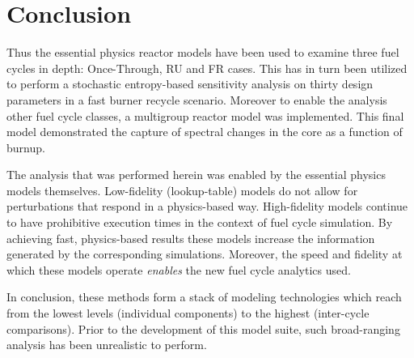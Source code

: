 \chapter{Conclusion}
%
\label{diss_conclusion}
Thus the essential physics reactor models have been used to examine three fuel cycles 
in depth: Once-Through, RU and FR cases.  This has in turn been utilized to perform 
a stochastic entropy-based sensitivity analysis on thirty design parameters in a fast
burner recycle scenario.  Moreover to enable the analysis other fuel cycle classes, 
a multigroup reactor model was implemented.  This final model demonstrated the capture 
of spectral changes in the core as a function of burnup.

The analysis that was performed herein was enabled by the essential physics models themselves.
Low-fidelity (lookup-table) models do not allow for perturbations that respond 
in a physics-based way.  High-fidelity models continue to have prohibitive execution times in the 
context of fuel cycle simulation.  By achieving fast, physics-based results these models increase 
the information generated by the corresponding simulations.
Moreover, the speed and fidelity at which these models operate \emph{enables} the 
new fuel cycle analytics used.  

In conclusion, these methods form a stack of modeling technologies which reach from the lowest levels
(individual components) to the highest (inter-cycle comparisons).
Prior to the development of this model suite, such broad-ranging analysis has been unrealistic to perform.
